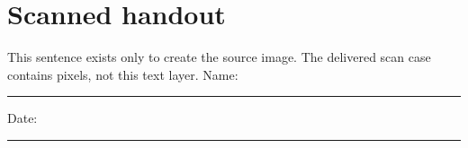 \documentclass[11pt]{article}
\begin{document}
\section{Scanned handout}
This sentence exists only to create the source image. The delivered scan case contains pixels, not this text layer.
\vspace{1cm}
\Large Name: \rule{7cm}{0.4pt}\par
\Large Date: \rule{7cm}{0.4pt}
\end{document}

